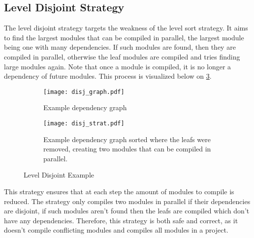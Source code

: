 

\pagebreak
\subsection{Level Disjoint Strategy} \label{sub:design disjoint strategy}

The level disjoint strategy targets the weakness of the level sort strategy. It
aims to find the largest modules that can be compiled in parallel, the largest
module being one with many dependencies. If such modules are found, then they
are compiled in parallel, otherwise the leaf modules are compiled and tries
finding large modules again. Note that once a module is compiled, it is no
longer a dependency of future modules. This process is visualized below on
\cref{subfig:disj strat}.
\begin{figure}[H]
  \begin{subfigure}[t]{0.5\textwidth}
    \centering
    \texttt{[image: disj\_graph.pdf]}
    \caption{Example dependency graph}
    \label{fig:example disj dep graph}
  \end{subfigure} \hfill
  \begin{subfigure}[t]{0.40\textwidth}
    \centering
    \texttt{[image: disj\_strat.pdf]}
    \caption{Example dependency graph sorted where the leafs were removed,
    creating two modules that can be compiled in parallel. }
    \label{fig:example disj strat}
  \end{subfigure}
  \caption{Level Disjoint Example}
  \label{subfig:disj strat}
\end{figure}

This strategy ensures that at each step the amount of modules to compile is
reduced. The strategy only compiles two modules in parallel if their
dependencies are disjoint, if such modules aren't found then the leafs are
compiled which don't have any dependencies. Therefore, this strategy is both
safe and correct, as it doesn't compile conflicting modules and compiles all
modules in a project.

